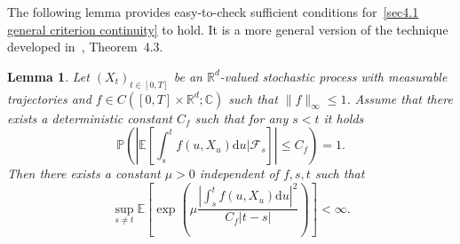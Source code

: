 \documentclass[10pt]{article}
\newcommand{\mathd}{\mathrm{d}}
\newcommand{\nobracket}{}
\newtheorem{lemma}[theorem]{Lemma}
\begin{document}
The following lemma provides easy\mbox{-}to\mbox{-}check sufficient conditions
for~{\eqref{sec4.1 general criterion continuity}} to hold. It is a more
general version of the technique developed in~{\cite{catelliergubinelli}},
Theorem~4.3.

\begin{lemma}
  \label{sec4.1 lemma condition rho irr}Let $(X_t)_{t \in [0, T]}$ be an
  $\mathbb{R}^d$-valued stochastic process with measurable trajectories and $f
  \in C ([0, T] \times \mathbb{R}^d ; \mathbb{C})$ such that $\| f \|_{\infty}
  \leqslant 1$. Assume that there exists a deterministic constant $C_f$ such
  that for any $s < t$ it holds
  \begin{equation}
    \mathbb{P} \left( \left| \mathbb{E} \left[ \int_s^t f (u, X_u) \mathd u |
    \mathcal{F}_s \nobracket \right] \right| \leqslant C_f \right) = 1.
  \end{equation}
  Then there exists a constant $\mu > 0$ independent of $f, s, t$ such that
  \begin{equation}
    \sup_{s \neq t} \mathbb{E} \left[ \exp \left( \mu \frac{\left| \int_s^t f
    (u, X_u) \mathd u \right|^2}{C_f  | t - s |} \right) \right] < \infty
    \label{sec4.1 exp estimate lemma} .
  \end{equation}
\end{lemma}
\end{document}
